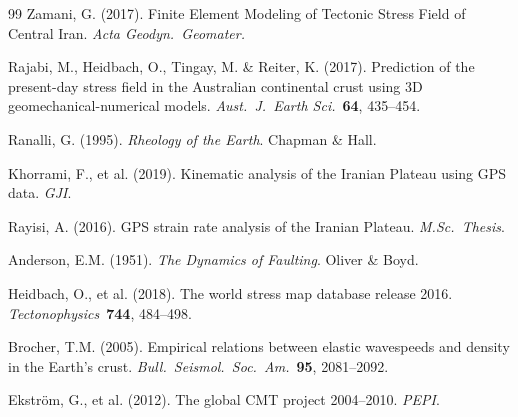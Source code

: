 \documentclass[11pt, a4paper]{article}
\begin{document}
\begin{thebibliography}{99}
Zamani, G. (2017). Finite Element Modeling of Tectonic Stress Field of Central Iran. \textit{Acta Geodyn.\ Geomater.}

Rajabi, M., Heidbach, O., Tingay, M. \& Reiter, K. (2017). Prediction of the present-day stress field in the Australian continental crust using 3D geomechanical-numerical models. \textit{Aust.\ J.\ Earth Sci.}\ \textbf{64}, 435--454.

Ranalli, G. (1995). \textit{Rheology of the Earth}. Chapman \& Hall.

Khorrami, F., et al. (2019). Kinematic analysis of the Iranian Plateau using GPS data. \textit{GJI}.

Rayisi, A. (2016). GPS strain rate analysis of the Iranian Plateau. \textit{M.Sc.\ Thesis}.

Anderson, E.M. (1951). \textit{The Dynamics of Faulting}. Oliver \& Boyd.

Heidbach, O., et al. (2018). The world stress map database release 2016. \textit{Tectonophysics}\ \textbf{744}, 484--498.

Brocher, T.M. (2005). Empirical relations between elastic wavespeeds and density in the Earth's crust. \textit{Bull.\ Seismol.\ Soc.\ Am.}\ \textbf{95}, 2081--2092.

Ekstr\"om, G., et al. (2012). The global CMT project 2004--2010. \textit{PEPI}.

\end{thebibliography}
\end{document}

